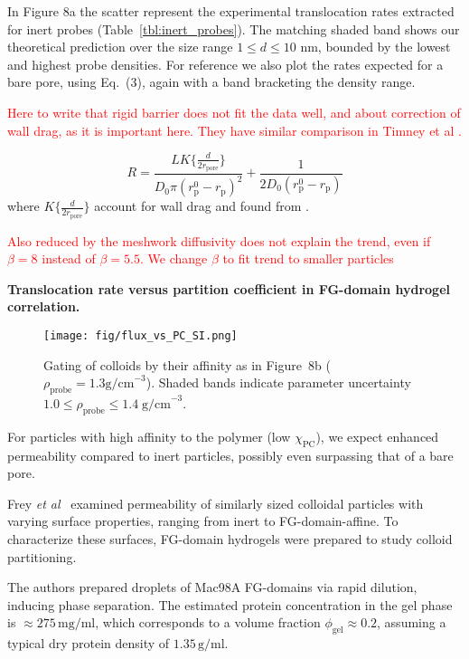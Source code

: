 \documentclass[10pt, a4paper]{article}
\newcommand\todo[1]{\textcolor{red}{#1}}
\begin{document}
\begin{multicols}{2}
In Figure 8a the scatter represent the experimental translocation rates extracted for inert probes (Table~\ref{tbl:inert_probes}).
The matching shaded band shows our theoretical prediction over the size range $1 \le d \le 10$ nm, bounded by the lowest and highest probe densities.
For reference we also plot the rates expected for a bare pore, using Eq.~(3), again with a band bracketing the density range.

\todo{Here to write that rigid barrier does not fit the data well, and about correction of wall drag, as it is important here.
They have similar comparison in Timney et al \cite{Timney2016}.}

\begin{equation}
    R = \frac{LK\{\frac{d}{2r_{\text{pore}}}\}}{D_0 \pi (r_{\text{p}}^0-r_{\text{p}})^{2}} + \frac{1}{2 D_0 (r_{\text{p}}^0-r_{\text{p}})}
    \label{eq:resistance}
\end{equation}
where $K\{\frac{d}{2r_{\text{pore}}}\}$ account for wall drag and found from \cite{Haberman1958}.

\todo{Also reduced by the meshwork diffusivity does not explain the trend, even if $\beta = 8$ instead of $\beta = 5.5$. We change $\beta$ to fit trend to smaller particles}

\textbf{Translocation rate versus partition coefficient in FG-domain hydrogel correlation.}

\begin{figure}[H]
    \centering
    \texttt{[image: fig/flux\_vs\_PC\_SI.png]}
    \caption{%
    Gating of colloids by their affinity as in Figure~8b ($\rho_{\text{probe}} =1.3 \text{g/cm}^{-3}$).
    Shaded bands indicate parameter uncertainty $1.0 \le \rho_{\text{probe}} \le 1.4\;\text{g/cm}^{-3}$.
    }
    \label{fig:flux_vs_PC}
\end{figure}

For particles with high affinity to the polymer (low $\chi_{\text{PC}}$), we expect enhanced permeability compared to inert particles, possibly even surpassing that of a bare pore.

Frey \textit{et al}~\cite{Frey2018} examined permeability of similarly sized colloidal particles with varying surface properties, ranging from inert to FG-domain-affine.
To characterize these surfaces, FG-domain hydrogels were prepared to study colloid partitioning.

The authors prepared droplets of Mac98A FG-domains via rapid dilution, inducing phase separation. 
The estimated protein concentration in the gel phase is $\approx 275 \, \text{mg}/\text{ml}$, which corresponds to a volume fraction $\phi_{\text{gel}} \approx 0.2$, assuming a typical dry protein density of $1.35 \, \text{g}/\text{ml}$.


\end{multicols}
\end{document}
